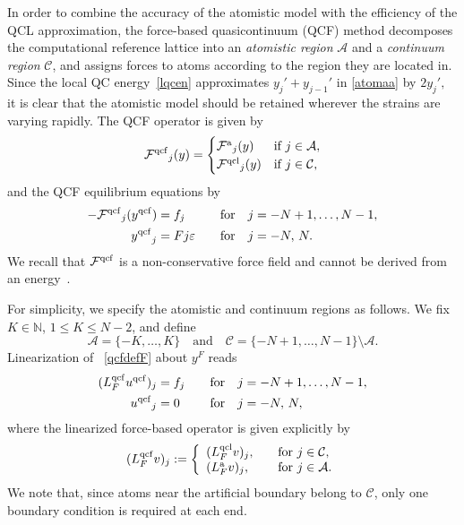 \documentclass[12pt,reqno]{amsart}
\begin{document}
In order to combine the accuracy of the atomistic model with the
efficiency of the QCL approximation, the force-based quasicontinuum
(QCF) method decomposes the computational reference lattice into an
{\it atomistic region} $\mathcal{A}$ and a {\it continuum region}
$\mathcal{C}$, and assigns forces to atoms according to the region
they are located in. Since the local QC energy~\eqref{lqcen}
approximates $y_j'+y_{j-1}'$ in \eqref{atomaa} by $2y_j',$ it is clear
that the atomistic model should be retained wherever the strains are
varying rapidly. The QCF operator is given
by~\cite{Dobson:2008a,dobsonluskin08}
\begin{equation}
\label{qcfdefF}
{{\mathcal{F}}^{{\rm qcf}}}_j({y})=
\begin{cases}
{{\mathcal{F}}^{{\rm a}}}_j({y})& \text{if $j\in \mathcal{A}$},\\
{{\mathcal{F}}^{{\rm qcl}}}_j({y})& \text{if $j\in \mathcal{C}$},
\end{cases}
\end{equation}
and the QCF equilibrium equations by
\begin{equation*}
\begin{aligned}
-{{\mathcal{F}}^{{\rm qcf}}}_j({y^{{\rm qcf}}}) &= f_j&\quad&\text{for} \quad j = -N+1, \dots, N-1,\\
{y^{{\rm qcf}}}_{j}&=Fj{\varepsilon}& \quad&\text{for} \quad j = -N,\,N.
\end{aligned}
\end{equation*}
We recall that ${{\mathcal{F}}^{{\rm qcf}}}$ is a non-conservative
force field and cannot be derived from an
energy~\cite{Dobson:2008a}.

For simplicity, we specify the atomistic and continuum regions as
follows. We fix $K \in {\mathbb{N}}$, $1 \leq K \leq N-2$, and define
\begin{displaymath}
  \mathcal{A} = \{-K,\dots,K\} \quad \text{and} \quad
  \mathcal{C} = \{-N+1, \dots, N-1\} \setminus \mathcal{A}.
\end{displaymath}
Linearization of ~\eqref{qcfdefF} about ${y}^F$ reads
\begin{equation}
  \label{qcf}
  \begin{aligned}
    ({L^{{\rm qcf}}_F} {u^{{\rm qcf}}})_j&=f_j&\quad&\text{for} \quad j = -N+1, \dots, N-1,\\
    {u^{{\rm qcf}}}_{j}&=0&\quad&\text{for} \quad j = -N,\,N,
  \end{aligned}
\end{equation}
where the linearized force-based operator is given explicitly by
\begin{displaymath}
  ({L^{{\rm qcf}}_F} v)_j := \left\{
    \begin{array}{ll}
      ({L^{{\rm qcl}}_F} v)_j, & \quad\text{for } j \in {\mathcal{C}}, \\
      ({L^{{\rm a}}_F} v)_j, & \quad \text{for } j \in {\mathcal{A}}.
  \end{array} \right.
\end{displaymath}
We note that, since atoms near the artificial boundary belong to
$\mathcal{C}$, only one boundary condition is required at each end.
\end{document}
